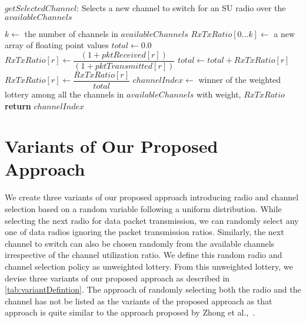 \begin{algorithm}
\caption{$\mathit{getSelectedChannel}$: Selects a new channel to switch for an SU radio over the $\mathit{availableChannels}$}
\label{alg:getSelectedRadio}
\begin{algorithmic}[1]
\State $k \gets$ the number of channels in $\mathit{availableChannels}$
\State $\mathit{RxTxRatio} [0\ldots k] \gets $ a new array of floating point values
\State $\mathit{total} \gets 0.0$
\State $\mathit{RxTxRatio}[r] \gets \dfrac{(1+\mathit{pktReceived}[\mathit{r}])}{(1+\mathit{pktTransmitted}[\mathit{r}])}$
\State $\mathit{total} \gets \mathit{total} + \mathit{RxTxRatio}[r]$
\EndFor
{}
\State $\mathit{RxTxRatio}[r] \gets \dfrac{\mathit{RxTxRatio}[r]}{\mathit{total}}$
\EndFor
\State $\mathit{channelIndex} \gets$ winner of the weighted lottery among all the channels in $\mathit{availableChannels}$ with weight, $\mathit{RxTxRatio}$
\State \textbf{return} $\mathit{channelIndex}$
\EndFunction
\end{algorithmic}
\end{algorithm}

\section{Variants of Our Proposed Approach}

We create three variants of our proposed approach introducing radio and channel selection based on a random variable following a uniform distribution. While selecting the next radio for data packet transmission, we can randomly select any one of data radios ignoring the packet transmission ratios. Similarly, the next channel to switch can also be chosen randomly from the available channels irrespective of the channel utilization ratio. We define this random radio and channel selection policy as unweighted lottery. From this unweighted lottery, we devise three variants of our proposed approach as described in \cref{tab:variantDefintion}. The approach of randomly selecting both the radio and the channel has not be listed as the variants of the proposed approach as that approach is quite similar to the approach proposed by Zhong et al.,~\cite{zhong2014capacity}.

